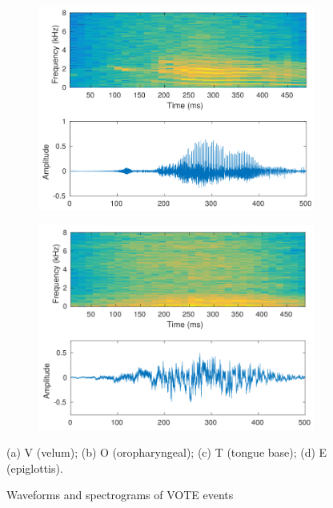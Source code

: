 \begin{figure}[h]
\begin{subfigure}{.4\textwidth}
		\caption{}
		\label{fig:O}
	\end{subfigure}
	\begin{subfigure}{.4\textwidth}
		\includegraphics[width=\linewidth]{img/T_spec_crop.pdf}
		\caption{}
		\label{fig:T}
	\end{subfigure}
	\begin{subfigure}{.4\textwidth}
		\includegraphics[width=\linewidth]{img/E_spec_crop.pdf}
		\caption{}
		\label{fig:E}
	\end{subfigure}
	\caption[Spectrograms of VOTE sounds]{Waveforms and spectrograms of VOTE events}{(a) V (velum); (b) O (oropharyngeal); (c) T (tongue base); (d) E (epiglottis).}
	\label{fig:vote_spectrograms}
\end{figure}


